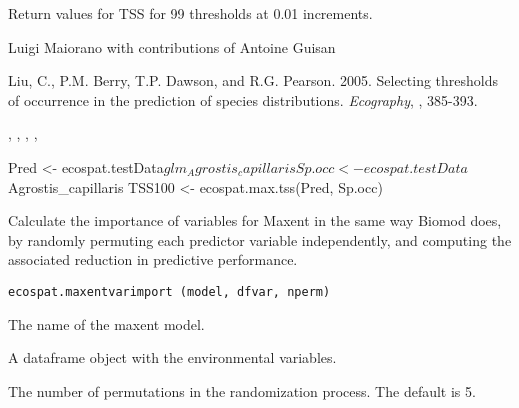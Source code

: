 \documentclass[a4paper]{book}
\begin{document}
%
\begin{Value}
Return values for TSS for 99 thresholds at 0.01 increments. 
\end{Value}
%
\begin{Author}\relax
Luigi Maiorano  with contributions of Antoine Guisan 
\end{Author}
%
\begin{References}\relax
Liu, C., P.M. Berry, T.P. Dawson, and R.G. Pearson. 2005. Selecting thresholds of occurrence in the prediction of species distributions. \emph{Ecography}, , 385-393.
\end{References}
%
\begin{SeeAlso}\relax
{}, , , , 
\end{SeeAlso}
%
\begin{Examples}
\begin{ExampleCode}

Pred <- ecospat.testData$glm_Agrostis_capillaris
Sp.occ <- ecospat.testData$Agrostis_capillaris
TSS100 <- ecospat.max.tss(Pred, Sp.occ)
\end{ExampleCode}
\end{Examples}
%
\begin{Description}\relax
Calculate the importance of variables for Maxent in the same way Biomod does, by randomly permuting each predictor variable independently, and computing the associated reduction in predictive performance.
\end{Description}
%
\begin{Usage}
\begin{verbatim}
ecospat.maxentvarimport (model, dfvar, nperm)
\end{verbatim}
\end{Usage}
%
\begin{Arguments}
\begin{ldescription}
\item[\code{model}] The name of the maxent model.
\item[\code{dfvar}] A dataframe object with the environmental variables.
\item[\code{nperm}] The number of permutations in the randomization process. The default is 5.
\end{ldescription}
\end{Arguments}
\end{document}
